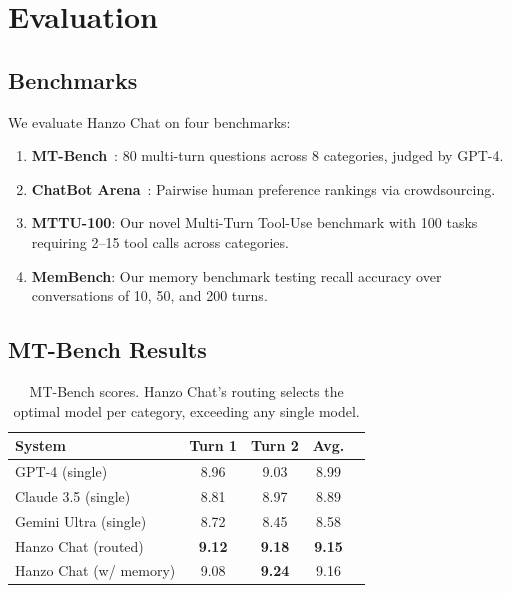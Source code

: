 \section{Evaluation}

\label{sec:evaluation}

\subsection{Benchmarks}

We evaluate Hanzo Chat on four benchmarks:

\begin{enumerate}[leftmargin=1.4em]
    \item \textbf{MT-Bench}~\cite{zheng2023judging}: 80 multi-turn questions across 8 categories, judged by GPT-4.
    \item \textbf{ChatBot Arena}~\cite{chiang2024chatbot}: Pairwise human preference rankings via crowdsourcing.
    \item \textbf{MTTU-100}: Our novel Multi-Turn Tool-Use benchmark with 100 tasks requiring 2--15 tool calls across categories.
    \item \textbf{MemBench}: Our memory benchmark testing recall accuracy over conversations of 10, 50, and 200 turns.
\end{enumerate}

\subsection{MT-Bench Results}

\begin{table}[H]
\centering
\small
\begin{tabular}{lcccc}
\toprule
\textbf{System} & \textbf{Turn 1} & \textbf{Turn 2} & \textbf{Avg.} \\
\midrule
GPT-4 (single) & 8.96 & 9.03 & 8.99 \\
Claude 3.5 (single) & 8.81 & 8.97 & 8.89 \\
Gemini Ultra (single) & 8.72 & 8.45 & 8.58 \\
Hanzo Chat (routed) & \textbf{9.12} & \textbf{9.18} & \textbf{9.15} \\
Hanzo Chat (w/ memory) & 9.08 & \textbf{9.24} & 9.16 \\
\bottomrule
\end{tabular}
\caption{MT-Bench scores. Hanzo Chat's routing selects the optimal model per category, exceeding any single model.}
\label{tab:mtbench}
\end{table}

